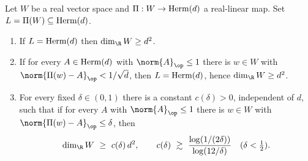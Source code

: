 \begin{lemma}
\label{lem:quaddim}
Let $W$ be a real vector space and $\Pi:W\to\mathrm{Herm}(d)$ a real-linear map. Set
$L=\Pi(W)\subseteq\mathrm{Herm}(d)$.
\begin{enumerate}[leftmargin=2em]
\item If $L=\mathrm{Herm}(d)$ then $\dim_\R W\ge d^2$.
\item If for every $A\in\mathrm{Herm}(d)$ with $\norm{A}_{\op}\le1$ there is $w\in W$ with
$\norm{\Pi(w)-A}_{\op}<1/\sqrt d$, then $L=\mathrm{Herm}(d)$, hence $\dim_\R W\ge d^2$.
\item For every fixed $\delta\in(0,1)$ there is a constant $c(\delta)>0$,
independent of $d$, such that if for every $A$ with $\norm{A}_{\op}\le1$ there is
$w\in W$ with $\norm{\Pi(w)-A}_{\op}\le\delta$, then
\[
\dim_\R W\ \ge\ c(\delta)\,d^2,
\qquad
c(\delta)\ \gtrsim\ \frac{\log(1/(2\delta))}{\log(12/\delta)}\quad(\delta<\tfrac12).
\]
\end{enumerate}
\end{lemma}

